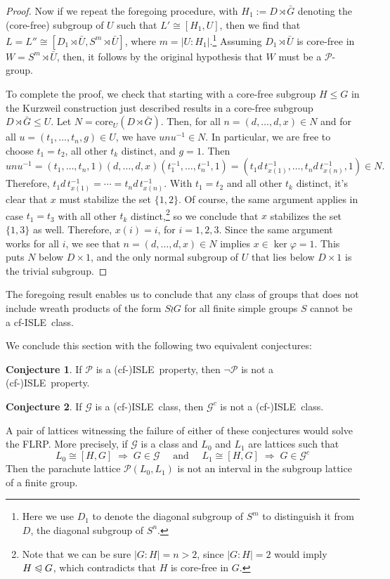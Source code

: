\documentclass[cm,dissertation]{uhthesis}
\theoremstyle{plain}
\theoremstyle{definition}
\newcounter{conjecture}
\newtheorem{conjecture}[conjecture]{Conjecture}
\theoremstyle{remark}
\numberwithin{theorem}{section}
\numberwithin{claim}{chapter}
\numberwithin{equation}{section}
\numberwithin{conjecture}{chapter}
\newcommand{\<}{\ensuremath{\langle}}
\renewcommand{\>}{\ensuremath{\rangle}}
\renewcommand{\leq}{\ensuremath{\leqslant}}
\newcommand{\subnormal}{\ensuremath{\trianglelefteqslant}}
\newcommand{\core}{\ensuremath{\mathrm{core}}}
\newcommand{\FLRP}{{\small FLRP}}
\newcommand{\0}{\ensuremath{\mathbf{0}}}
\newcommand{\1}{\ensuremath{\mathbf{1}}}
\newcommand{\2}{\ensuremath{\mathbf{2}}}
\newcommand{\3}{\ensuremath{\mathbf{3}}}
\newcommand{\4}{\ensuremath{\mathbf{4}}}
\newcommand{\5}{\ensuremath{\mathbf{5}}}
\newcommand{\sG}{\ensuremath{\mathscr{G}}}
\newcommand{\sP}{\ensuremath{\mathscr{P}}}
\newcommand{\cP}{\ensuremath{\mathcal{P}}}
\newcommand{\solvable}{\ensuremath{\mathfrak{S}}}
\newcommand{\ISLE}{{\small ISLE}}
\renewcommand{\phi}{\ensuremath{\varphi}}
\begin{document}
\begin{proof}
  Now if we repeat the foregoing procedure, with $H_1 := D\rtimes \bar{G}$ denoting the
  (core-free) subgroup of $U$ such that $L' \cong [H_1, U]$, then we find that
  $L = L''\cong [D_1\rtimes \bar{U}, S^m\rtimes
    \bar{U}]$, where $m = |U:H_1|$.\footnote{Here we use $D_1$ to denote the
    diagonal subgroup of $S^m$ to distinguish it from $D$, the diagonal subgroup
    of $S^n$.} 
 Assuming $D_1\rtimes \bar{U}$ is core-free in $W = S^m\rtimes \bar{U}$, then, 
it follows by the original hypothesis that $W$ must be a $\cP$-group.

  To complete the proof, we check that starting with a core-free subgroup
  $H \leq G$ in the Kurzweil construction just described results in a
  core-free subgroup $D\rtimes \bar{G} \leq U$.   Let $N = \core_U(D\rtimes
  \bar{G})$.  Then, for all $n=(d,\dots, d, x) \in N$ and for all 
  $u = (t_1,\dots, t_n, g)\in U$, we have $unu^{-1}\in N$.  In particular, we
  are free to choose
  $t_1 = t_2$, all other $t_k$ distinct, and $g=1$.  Then 
  \[
  u n u^{-1} = (t_1,\dots, t_n, 1) (d, \dots, d, x) (t_1^{-1},\dots, t_n^{-1}, 1)
  =(t_1 d \,t_{x(1)}^{-1},\dots, t_nd \,t_{x(n)}^{-1}, 1) \in N.\]
  Therefore, $t_1 d\, t_{x(1)}^{-1} = \cdots = t_nd \,t_{x(n)}^{-1}$. With $t_1 = t_2$
  and all other $t_k$ distinct, it's clear that $x$ must stabilize the set $\{1,2\}$.
  Of course, the same argument applies in case $t_1 = t_3$ with all other $t_k$
  distinct,\footnote{Note that we can be sure $|G:H| = n > 2$, since $|G:H|=2$
    would imply $H\subnormal G$, which contradicts that $H$ is core-free in $G$.}
  so we conclude that $x$ stabilizes the set $\{1, 3\}$ as well.  Therefore, $x(i)
  = i$, for $i=1, 2, 3$.  Since the same argument works for all $i$, we see that
  $n=(d,\dots,d, x) \in N$ implies $x\in \ker \phi = 1$.  This puts $N$ below
  $D\times 1$, and the only normal subgroup of $U$ that lies 
  below $D\times 1$ is the trivial subgroup.
\end{proof}
The foregoing result enables us to conclude that any class of groups that does
not include wreath products of the form $S\wr G$ for all finite simple groups
$S$ cannot be a cf-\ISLE\ class. %

\vskip2mm

We conclude this section with the following two equivalent conjectures:
\begin{conjecture}
\label{conjecture:isle-prop}
  If $\cP$ is a (cf-)\ISLE\ property, then $\neg \cP$ is not a (cf-)\ISLE\ property.
\end{conjecture}
\begin{conjecture}
\label{conjecture:isle-prop2}
If $\sG$ is a (cf-)\ISLE\ class, then $\sG^c$ is not a (cf-)\ISLE\ class.
\end{conjecture}
\noindent A pair of lattices witnessing the failure of either of these conjectures 
would solve the \FLRP.  More precisely, if $\sG$ is a class and $L_0$ and $L_1$ are
lattices such that 
\[
L_0 \cong [H, G] \; \Rightarrow \; G\in \sG \quad \text{ and } \quad
L_1 \cong [H, G] \; \Rightarrow \; G\in \sG^c
\]
Then the parachute lattice $\sP(L_0, L_1)$ is not an interval in the subgroup
lattice of a finite group.
\end{document}
